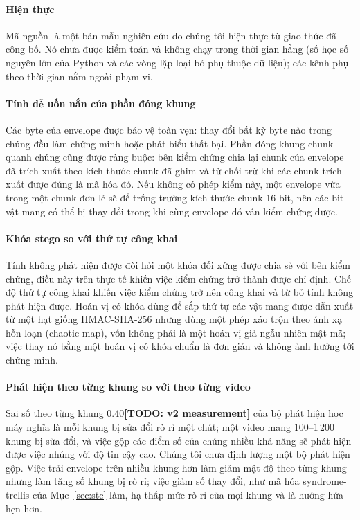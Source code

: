 \documentclass[journal]{IEEEtran}
\newcommand{\todo}[1]{\textbf{[TODO: #1]}}
\begin{document}
\paragraph{Hiện thực} Mã nguồn là một bản mẫu nghiên cứu do chúng tôi hiện thực
từ giao thức đã công bố. Nó chưa được kiểm toán và không chạy trong thời gian
hằng (số học số nguyên lớn của Python và các vòng lặp loại bỏ phụ thuộc dữ
liệu); các kênh phụ theo thời gian nằm ngoài phạm vi.

\paragraph{Tính dễ uốn nắn của phần đóng khung} Các byte của envelope được bảo
vệ toàn vẹn: thay đổi bất kỳ byte nào trong chúng đều làm chứng minh hoặc phát
biểu thất bại. Phần đóng khung chunk quanh chúng cũng được ràng buộc: bên kiểm
chứng chia lại chunk của envelope đã trích xuất theo kích thước chunk đã ghim và
từ chối trừ khi các chunk trích xuất được đúng là mã hóa đó. Nếu không có phép
kiểm này, một envelope vừa trong một chunk đơn lẻ sẽ để trống trường
kích-thước-chunk 16 bit, nên các bit vật mang có thể bị thay đổi trong khi cùng
envelope đó vẫn kiểm chứng được.

\paragraph{Khóa stego so với thứ tự công khai} Tính không phát hiện được đòi hỏi
một khóa đối xứng được chia sẻ với bên kiểm chứng, điều này trên thực tế khiến
việc kiểm chứng trở thành được chỉ định. Chế độ thứ tự công khai khiến việc kiểm
chứng trở nên công khai và từ bỏ tính không phát hiện được. Hoán vị có khóa dùng
để sắp thứ tự các vật mang được dẫn xuất từ một hạt giống HMAC-SHA-256 nhưng
dùng một phép xáo trộn theo ánh xạ hỗn loạn (chaotic-map), vốn không phải là một
hoán vị giả ngẫu nhiên mật mã; việc thay nó bằng một hoán vị có khóa chuẩn là
đơn giản và không ảnh hưởng tới chứng minh.

\paragraph{Phát hiện theo từng khung so với theo từng video} Sai số theo từng
khung 0.40\todo{v2 measurement} của bộ phát hiện học máy nghĩa là mỗi khung bị sửa đổi rò rỉ một
chút; một video mang 100--1\,200 khung bị sửa đổi, và việc gộp các điểm số của
chúng nhiều khả năng sẽ phát hiện được việc nhúng với độ tin cậy cao. Chúng tôi
chưa định lượng một bộ phát hiện gộp. Việc trải envelope trên nhiều khung hơn
làm giảm mật độ theo từng khung nhưng làm tăng số khung bị rò rỉ; việc giảm số
thay đổi, như mã hóa syndrome-trellis của Mục~\ref{sec:stc} làm, hạ thấp mức rò
rỉ của mọi khung và là hướng hứa hẹn hơn.
\end{document}
